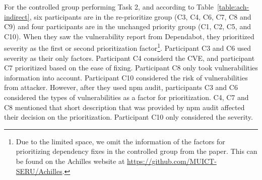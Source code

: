\documentclass[conference]{IEEEtran}
\begin{document}
	
	
	For the controlled group performing Task 2, and according to Table~\ref{table:ach-indirect}, six participants are in the re-prioritize group (C3, C4, C6, C7, C8 and C9) and four participants are in the unchanged priority group (C1, C2, C5, and C10). 
	When they saw the vulnerability report from Dependabot, they prioritized severity as the first or second prioritization factor\footnote{Due to the limited space, we omit the information of the factors for prioritizing dependency fixes in the controlled group from the paper. This can be found on the Achilles website at \url{https://github.com/MUICT-SERU/Achilles}.}. Participant C3 and C6 used severity as their only factors. Participant C4 considerd the CVE, and participant C7 prioritized based on the ease of fixing. Participant C8 only took vulnerabilities information into account. Participant C10 considered the risk of vulnerabilities from attacker. However, after they used npm audit, participants C3 and C6 considered the types of vulnerabilities as a factor for prioritization. C4, C7 and C8 mentioned that short description that was provided by npm audit affected their decision on the prioritization. Participant C10 only considered the severity.
	
\end{document}
